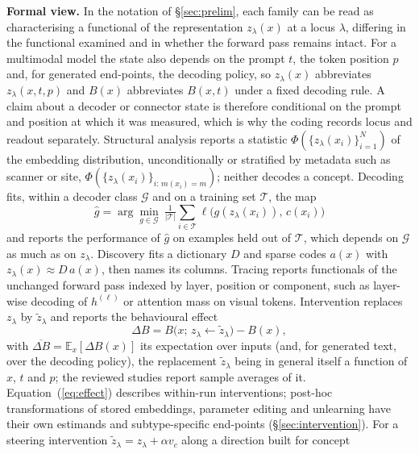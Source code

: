 \textbf{Formal view.} In the notation of \S\ref{sec:prelim}, each family can be read as characterising a
functional of the representation $z_\lambda(x)$ at a locus $\lambda$, differing in the functional
examined and in whether the forward pass remains intact. For a multimodal model the state also depends on the prompt $t$, the token position $p$ and, for generated
end-points, the decoding policy, so $z_\lambda(x)$ abbreviates $z_\lambda(x,t,p)$ and $B(x)$ abbreviates
$B(x,t)$ under a fixed decoding rule. A claim about a decoder or connector state is therefore conditional on
the prompt and position at which it was measured, which is why the coding records locus and readout
separately. Structural analysis reports a
statistic $\Phi(\{z_\lambda(x_i)\}_{i=1}^{N})$ of the embedding distribution, unconditionally
or stratified by metadata such as scanner or site, $\Phi(\{z_\lambda(x_i)\}_{i:\,m(x_i)=m})$;
neither decodes a concept. Decoding fits, within a decoder class $\mathcal{G}$ and on a training set
$\mathcal{T}$, the map
\begin{equation}
\hat g=\arg\min_{g\in\mathcal G}\ \tfrac{1}{|\mathcal T|}\textstyle\sum_{i\in\mathcal T}\ell\big(g(z_\lambda(x_i)),\,c(x_i)\big)
\label{eq:probe}
\end{equation}
and reports the performance of $\hat g$ on examples held out of $\mathcal T$, which depends on
$\mathcal G$ as much as on $z_\lambda$. Discovery fits a dictionary $D$ and sparse codes $a(x)$ with $z_\lambda(x)\approx D\,a(x)$,
then names its columns. Tracing reports functionals of the unchanged forward pass indexed by
layer, position or component, such as layer-wise decoding of $h^{(\ell)}$ or attention mass on
visual tokens. Intervention replaces $z_\lambda$ by $\tilde z_\lambda$ and reports the
behavioural effect
\begin{equation}
\Delta B=B\big(x;\,z_\lambda\!\leftarrow\!\tilde z_\lambda\big)-B(x),
\label{eq:effect}
\end{equation}
with $\overline{\Delta B}=\mathbb{E}_x[\Delta B(x)]$ its expectation over inputs (and, for generated text, over
the decoding policy), the replacement $\tilde z_\lambda$ being in general itself a function of $x$, $t$ and
$p$; the reviewed studies report sample averages of it. Equation~(\ref{eq:effect})
describes within-run interventions; post-hoc transformations of stored embeddings, parameter editing
and unlearning have their own estimands and subtype-specific end-points (\S\ref{sec:intervention}).
For a steering intervention $\tilde z_\lambda=z_\lambda+\alpha v_c$ along a direction built for concept
